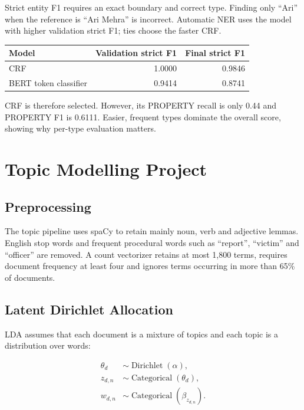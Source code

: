 \documentclass[12pt,a4paper]{report}
\begin{document}
Strict entity F1 requires an exact boundary and correct type. Finding only ``Ari'' when the reference is ``Ari Mehra'' is incorrect. Automatic NER uses the model with higher validation strict F1; ties choose the faster CRF.

\begin{center}
\begin{tabular}{lrr}
\toprule
Model & Validation strict F1 & Final strict F1 \\
\midrule
CRF & 1.0000 & 0.9846 \\
BERT token classifier & 0.9414 & 0.8741 \\
\bottomrule
\end{tabular}
\end{center}

CRF is therefore selected. However, its PROPERTY recall is only 0.44 and PROPERTY F1 is 0.6111. Easier, frequent types dominate the overall score, showing why per-type evaluation matters.

\chapter{Topic Modelling Project}

\section{Preprocessing}

The topic pipeline uses spaCy to retain mainly noun, verb and adjective lemmas. English stop words and frequent procedural words such as ``report'', ``victim'' and ``officer'' are removed. A count vectorizer retains at most 1,800 terms, requires document frequency at least four and ignores terms occurring in more than 65\% of documents.

\section{Latent Dirichlet Allocation}

LDA assumes that each document is a mixture of topics and each topic is a distribution over words:

\begin{align}
\theta_d &\sim \operatorname{Dirichlet}(\alpha),\\
z_{d,n} &\sim \operatorname{Categorical}(\theta_d),\\
w_{d,n} &\sim \operatorname{Categorical}(\beta_{z_{d,n}}).
\end{align}
\end{document}
